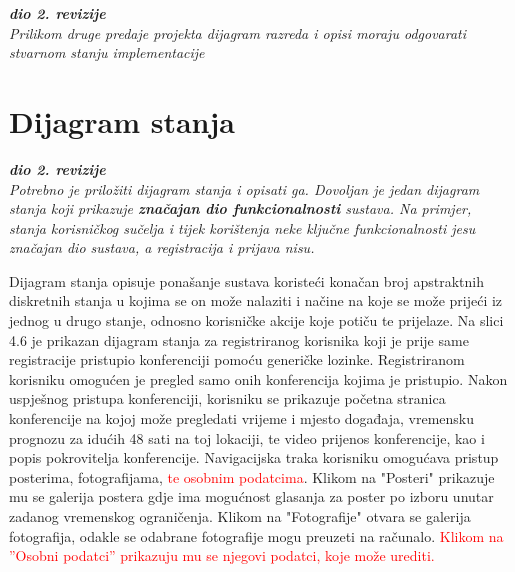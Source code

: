 			\clearpage
			 
			\textbf{\textit{dio 2. revizije}}\\			
			
			\textit{Prilikom druge predaje projekta dijagram razreda i opisi moraju odgovarati stvarnom stanju implementacije}
			
			
			
			\eject
		
		\section{Dijagram stanja}
			
			
			\textbf{\textit{dio 2. revizije}}\\
			
			\textit{Potrebno je priložiti dijagram stanja i opisati ga. Dovoljan je jedan dijagram stanja koji prikazuje \textbf{značajan dio funkcionalnosti} sustava. Na primjer, stanja korisničkog sučelja i tijek korištenja neke ključne funkcionalnosti jesu značajan dio sustava, a registracija i prijava nisu. }
			
			\indent Dijagram stanja opisuje ponašanje sustava koristeći konačan broj apstraktnih diskretnih stanja u kojima se on može nalaziti i načine na koje se može prijeći iz jednog u drugo stanje, odnosno korisničke akcije koje potiču te prijelaze. Na slici 4.6 je prikazan dijagram stanja za registriranog korisnika koji je prije same registracije pristupio konferenciji pomoću generičke lozinke. Registriranom korisniku omogućen je pregled samo onih konferencija kojima je pristupio. Nakon uspješnog pristupa konferenciji, korisniku se prikazuje početna stranica konferencije na kojoj može pregledati vrijeme i mjesto događaja, vremensku prognozu za idućih 48 sati na toj lokaciji, te video prijenos konferencije, kao i popis pokrovitelja konferencije. Navigacijska traka korisniku omogućava pristup posterima, fotografijama, \textcolor{red}{te osobnim podatcima}. Klikom na "Posteri" prikazuje mu se galerija postera gdje ima mogućnost glasanja za poster po izboru unutar zadanog vremenskog ograničenja. Klikom na "Fotografije" otvara se galerija fotografija, odakle se odabrane fotografije mogu preuzeti na računalo.
			\textcolor{red}{Klikom na ”Osobni podatci” prikazuju mu se njegovi podatci, koje može urediti.}
			
